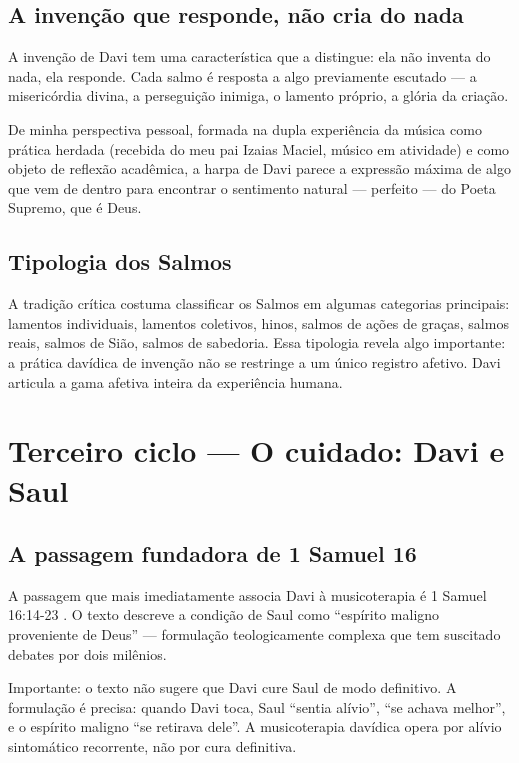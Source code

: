 \documentclass[12pt,a4paper]{article}
\begin{document}
\subsection{A invenção que responde, não cria do nada}

A invenção de Davi tem uma característica que a distingue: ela não inventa do nada, ela responde. Cada salmo é resposta a algo previamente escutado --- a misericórdia divina, a perseguição inimiga, o lamento próprio, a glória da criação.

De minha perspectiva pessoal, formada na dupla experiência da música como prática herdada (recebida do meu pai Izaias Maciel, músico em atividade) e como objeto de reflexão acadêmica, a harpa de Davi parece a expressão máxima de algo que vem de dentro para encontrar o sentimento natural --- perfeito --- do Poeta Supremo, que é Deus.

\subsection{Tipologia dos Salmos}

A tradição crítica costuma classificar os Salmos em algumas categorias principais: lamentos individuais, lamentos coletivos, hinos, salmos de ações de graças, salmos reais, salmos de Sião, salmos de sabedoria. Essa tipologia revela algo importante: a prática davídica de invenção não se restringe a um único registro afetivo. Davi articula a gama afetiva inteira da experiência humana.

\section{Terceiro ciclo --- O cuidado: Davi e Saul}

\subsection{A passagem fundadora de 1 Samuel 16}

A passagem que mais imediatamente associa Davi à musicoterapia é 1 Samuel 16:14-23 \citep{Biblia1993}. O texto descreve a condição de Saul como ``espírito maligno proveniente de Deus'' --- formulação teologicamente complexa que tem suscitado debates por dois milênios.

Importante: o texto não sugere que Davi cure Saul de modo definitivo. A formulação é precisa: quando Davi toca, Saul ``sentia alívio'', ``se achava melhor'', e o espírito maligno ``se retirava dele''. A musicoterapia davídica opera por alívio sintomático recorrente, não por cura definitiva.
\end{document}
